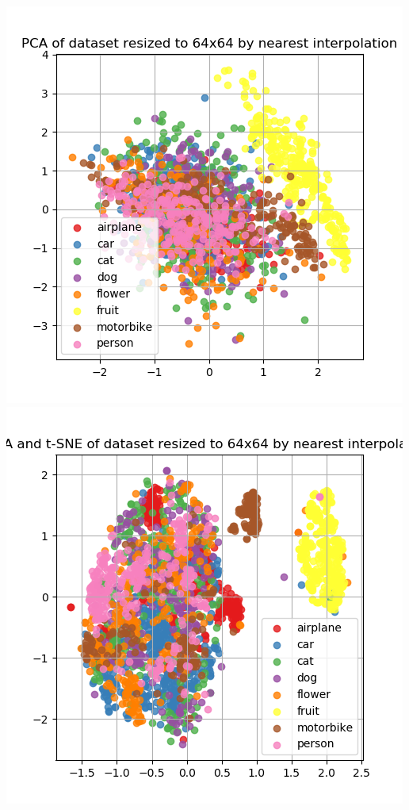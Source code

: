 \documentclass{article}
\begin{document}
\begin{minipage}[c]{\textwidth}
	\centering
	\includegraphics[width= \figureWidth\textwidth]{./figures/pca_h64_w64_r_none.png}
	\includegraphics[width= \figureWidth\textwidth]{./figures/pca_tsne_h64_w64_r_none.png}

\end{minipage}
\end{document}
